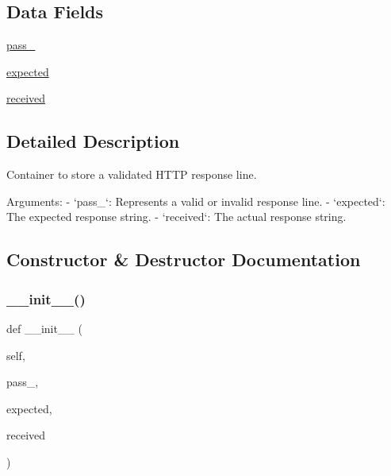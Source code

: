 \subsection*{Data Fields}
\begin{DoxyCompactItemize}
\item 
\hyperlink{classpewpewlaz0rt4nk_1_1_response_a40c180ffecdf131ba12f6a09349a1033}{pass\+\_\+}
\item 
\hyperlink{classpewpewlaz0rt4nk_1_1_response_aa6e67bddae371a5731f6d4002e787299}{expected}
\item 
\hyperlink{classpewpewlaz0rt4nk_1_1_response_a082fd9f55493d749cafc1e11ad84a2b6}{received}
\end{DoxyCompactItemize}


\subsection{Detailed Description}
\begin{DoxyVerb}Container to store a validated HTTP response line.

Arguments:
    - `pass_`: Represents a valid or invalid response line.
    - `expected`: The expected response string.
    - `received`: The actual response string.
\end{DoxyVerb}
 

\subsection{Constructor \& Destructor Documentation}
\mbox{\label{classpewpewlaz0rt4nk_1_1_response_aba15f6a5c8c7934fc61604b13ebb85a8}} 
\subsubsection{\texorpdfstring{\+\_\+\+\_\+init\+\_\+\+\_\+()}{\_\_init\_\_()}}
{\footnotesize\ttfamily def \+\_\+\+\_\+init\+\_\+\+\_\+ (\begin{DoxyParamCaption}\item[{}]{self,  }\item[{}]{pass\+\_\+,  }\item[{}]{expected,  }\item[{}]{received }\end{DoxyParamCaption})}

